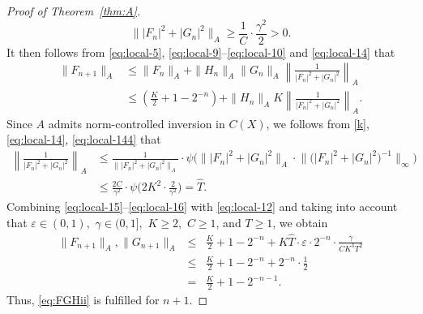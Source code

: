 \documentclass[12pt,fleqn]{amsart}
\theoremstyle{definition}
\numberwithin{equation}{section}
\theoremstyle{remark}
\newcommand{\e}{\varepsilon}
\begin{document}
\begin{proof}[Proof of Theorem~\ref{thm:A}]
%
\begin{equation}\label{eq:local-144}
    \| |F_n|^2+|G_n|^2\|_{A} \geqslant \frac{1}{C} \cdot \frac{\gamma^2}{2}>0.
\end{equation}
%
It then follows from \eqref{eq:local-5}, \eqref{eq:local-9}--\eqref{eq:local-10} and  \eqref{eq:local-14} that
%
\begin{equation}\label{eq:local-15}
    \begin{split}
        \|F_{n+1}\|_{A}
        &\leqslant 
        \|F_n\|_{A}+\|H_n\|_{A}\|G_n\|_{A}
        \left\|\frac{1}{|F_n|^2+|G_n|^2}\right\|_{A}\\
        &\leqslant 
        \left(\frac{K}{2}+1-2^{-n}\right)+\|H_n\|_{A}K
        \left\|\frac{1}{|F_n|^2+|G_n|^2}\right\|_{A}.
    \end{split}
\end{equation}
%
Since $A$ admits norm-controlled inversion in $C(X)$, we follows from \eqref{k}, \eqref{eq:local-14}, \eqref{eq:local-144}  that
%
\begin{equation}\label{eq:local-16}
    \begin{split}
        \left\|\frac{1}{|F_n|^2+|G_n|^2}\right\|_A 
        &\leqslant \frac{1}{\||F_n|^2+|G_n|^2\|_A}
        \cdot \psi\Big({\||F_n|^2+|G_n|^2\|_A
        \cdot \big\|\big(|F_n|^2+|G_n|^2\big)^{-1}\big\|_{\infty}}\Big) \\
        &\leqslant \frac{2C}{{\gamma}^2}
        \cdot \psi\bigg({2K^2
        \cdot \frac{2}{\gamma^2}}\bigg)= \widehat{T}.
    \end{split}
\end{equation}
%
Combining \eqref{eq:local-15}--\eqref{eq:local-16} with \eqref{eq:local-12}
and taking into account that $\e \in(0,1),$  $\gamma \in(0,1],$ $ K \geqslant 2,$ $C\geqslant 1$, and $T\geqslant 1$, we obtain
%
\begin{equation}\label{eq:local-17}
    \begin{array}{lcl}
        \|F_{n+1}\|_{A}, \|G_{n+1}\|_{A}
        &\leqslant &
        \frac{K}{2}+1-2^{-n}+ K \widehat{T} \cdot\e\cdot 2^{-n}\cdot\frac{\gamma}{CK^3T^2}\\
        &\leq&
        \frac{K}{2}+1-2^{-n}+2^{-n} \cdot \frac{1}{2}\\
        & = & \frac{K}{2}+1-2^{-n-1}.
    \end{array}
\end{equation}
%
Thus, \eqref{eq:FGHii} is fulfilled for $n+1$.


\end{proof}
\end{document}
